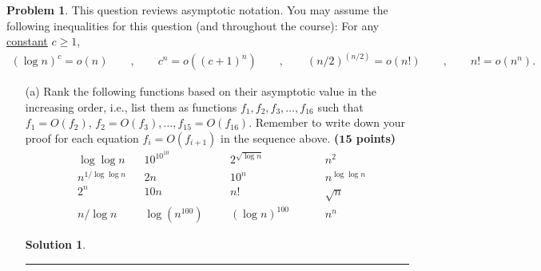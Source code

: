 \documentclass{article}
\theoremstyle{definition}
\newtheorem{problem}{Problem}
\def\fline{\rule{0.75\linewidth}{0.5pt}}
\newcommand{\finishline}{\begin{center}\fline\end{center}}
\newtheorem*{solution*}{Solution}
\newenvironment{solution}{\begin{solution*}}{{\finishline} \end{solution*}}
\newcommand{\grade}[1]{\hfill{\textbf{($\mathbf{#1}$ points)}}}
\begin{document}
\smallskip

\begin{problem}
	This question reviews asymptotic notation. You may assume the following inequalities for this question (and throughout the course): For any \underline{constant} $c \geq 1$, 
	\begin{align*}
		(\log{n})^c = o(n) \qquad, \qquad c^n = o((c+1)^n) \qquad,\qquad (n/2)^{(n/2)} = o(n!) \qquad,\qquad n! = o(n^n). 
	\end{align*}
	\begin{enumerate}
	\item[(a)] Rank the following functions based on their asymptotic value in the increasing order, i.e., list them as functions $f_1,f_2,f_3,\ldots,f_{16}$ such that $f_1 = O(f_2)$, $f_2 = O(f_3), \ldots, f_{15} = O(f_{16})$. Remember to write down your proof
	for each equation $f_i = O(f_{i+1})$ in the sequence above.  \grade{15}
	\begin{align*}
		&\log\log{n} && 10^{10^{10}} &&& 2^{\sqrt{\log{n}}} &&&& n^2 \\ 
		&n^{{1}/{\log\log{n}}} &&2n   &&&10^{n} &&&&n^{\log\log{n}} \\ 
		&2^{n} &&10n &&&n! &&&& \sqrt{n} \\
		&n/\log{n} && \log{(n^{100})} &&& (\log{n})^{100} &&&& n^n
	\end{align*}
	
	\begin{solution} 


\end{solution}
\end{enumerate}
\end{problem}
\end{document}
